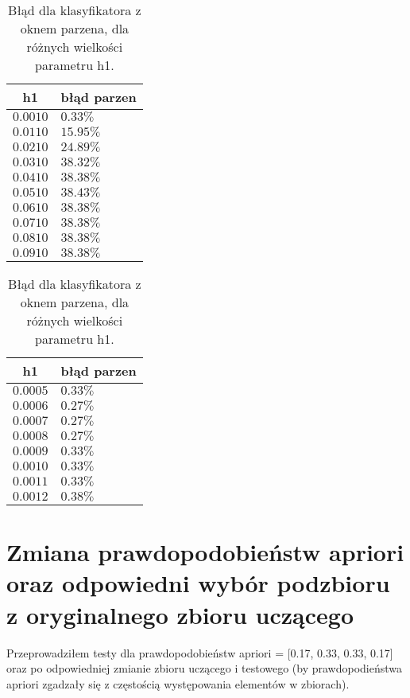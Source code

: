 \documentclass[fleqn]{article}
\begin{document}
\begin {table}
\begin{center}
\begin{tabular}{cl}
    \hline
    h1 & błąd parzen \\
    \hline
    $0.0010$ & $0.33\%$\\
    $0.0110$ & $15.95\%$\\
    $0.0210$ & $24.89\%$\\
    $0.0310$ & $38.32\%$\\
    $0.0410$ & $38.38 \%$\\
    $0.0510$ & $38.43\%$\\
    $0.0610$ & $38.38\%$\\
    $0.0710$ & $38.38\%$\\
    $0.0810$ & $38.38\%$\\
    $0.0910$ & $38.38\%$\\
    \hline
\end{tabular}
\caption {Błąd dla klasyfikatora z oknem parzena, dla różnych wielkości parametru h1.}
\label{table:3}
\end{center}
\end {table}

\begin {table}
\begin{center}
\begin{tabular}{cl}
    \hline
    h1 & błąd parzen \\
    \hline
    $0.0005$ & $0.33\%$\\
    $0.0006$ & $0.27\%$\\
    $0.0007$ & $0.27\%$\\
    $0.0008$ & $0.27\%$\\
    $0.0009$ & $0.33\%$\\
    $0.0010$ & $0.33\%$\\
    $0.0011$ & $0.33\%$\\
    $0.0012$ & $0.38\%$\\
    \hline
\end{tabular}
\caption {Błąd dla klasyfikatora z oknem parzena, dla różnych wielkości parametru h1.}
\label{table:4}
\end{center}
\end {table}


\section{Zmiana prawdopodobieństw apriori oraz odpowiedni wybór podzbioru z oryginalnego zbioru uczącego}
Przeprowadziłem testy dla prawdopodobieństw apriori = [0.17, 0.33, 0.33, 0.17] oraz po odpowiedniej zmianie zbioru uczącego i testowego (by prawdopodieństwa apriori zgadzały się z częstością występowania elementów w zbiorach).
\end{document}
